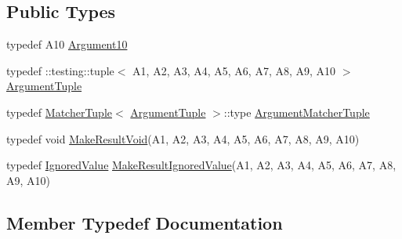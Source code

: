 \subsection*{Public Types}
\begin{DoxyCompactItemize}
\item 
typedef A10 \hyperlink{structtesting_1_1internal_1_1_function_3_01_r_07_a1_00_01_a2_00_01_a3_00_01_a4_00_01_a5_00_01_a6f6ff91550f0557b7708e490e5002cd35_a74022db8f1642276a1a9033da16cc2f5}{Argument10}
\item 
typedef \+::testing\+::tuple$<$ A1, A2, A3, A4, A5, A6, A7, A8, A9, A10 $>$ \hyperlink{structtesting_1_1internal_1_1_function_3_01_r_07_a1_00_01_a2_00_01_a3_00_01_a4_00_01_a5_00_01_a6f6ff91550f0557b7708e490e5002cd35_a38b8a4911806458eacc69740d4638d87}{Argument\+Tuple}
\item 
typedef \hyperlink{structtesting_1_1internal_1_1_matcher_tuple}{Matcher\+Tuple}$<$ \hyperlink{structtesting_1_1internal_1_1_function_3_01_r_07_08_4_ad483c3128c470d8cdb55c3ac1c575c11}{Argument\+Tuple} $>$\+::type \hyperlink{structtesting_1_1internal_1_1_function_3_01_r_07_a1_00_01_a2_00_01_a3_00_01_a4_00_01_a5_00_01_a6f6ff91550f0557b7708e490e5002cd35_ad2418eacffea2e3cc5466c93b1fd7002}{Argument\+Matcher\+Tuple}
\item 
typedef void \hyperlink{structtesting_1_1internal_1_1_function_3_01_r_07_a1_00_01_a2_00_01_a3_00_01_a4_00_01_a5_00_01_a6f6ff91550f0557b7708e490e5002cd35_aa0f1fef89e59875917d08ba584b05186}{Make\+Result\+Void}(A1, A2, A3, A4, A5, A6, A7, A8, A9, A10)
\item 
typedef \hyperlink{classtesting_1_1internal_1_1_ignored_value}{Ignored\+Value} \hyperlink{structtesting_1_1internal_1_1_function_3_01_r_07_a1_00_01_a2_00_01_a3_00_01_a4_00_01_a5_00_01_a6f6ff91550f0557b7708e490e5002cd35_a4e905802374219aa3e556ccc65191098}{Make\+Result\+Ignored\+Value}(A1, A2, A3, A4, A5, A6, A7, A8, A9, A10)
\end{DoxyCompactItemize}


\subsection{Member Typedef Documentation}

